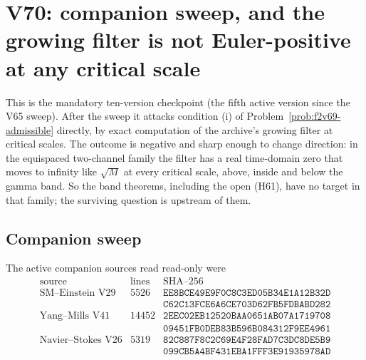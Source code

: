 \documentclass[11pt]{article}
\theoremstyle{definition}
\theoremstyle{remark}
\begin{document}




\clearpage
\section{V70: companion sweep, and the growing filter is not Euler-positive at any critical scale}
\label{sec:f2v70-filter}
\begingroup
\setcounter{equation}{0}
\renewcommand{\theequation}{N70.\arabic{equation}}
\renewcommand{\theHequation}{f2v70.\arabic{equation}}

This is the mandatory ten-version checkpoint (the fifth active version
since the V65 sweep).  After the sweep it attacks condition (i) of
Problem~\ref{prob:f2v69-admissible} directly, by exact computation of the
archive's growing filter at critical scales.  The outcome is negative and
sharp enough to change direction: in the equispaced two-channel family
the filter has a real time-domain zero that moves to infinity like
\(\sqrt M\) at every critical scale, above, inside and below the gamma
band.  So the band theorems, including the open (H61), have no target in
that family; the surviving question is upstream of them.

\subsection{Companion sweep}

The active companion sources read read-only were
\begin{equation}
\begin{array}{c|r|l}
\text{source}&\text{lines}&\text{SHA--256}\\ \hline
\text{SM--Einstein V29}&5526&
\texttt{EE8BCE49E9F0C8C3ED05B34E1A12B32D}\\
&&\texttt{C62C13FCE6A6CE703D62FB5FDBABD282}\\
\text{Yang--Mills V41}&14452&
\texttt{2EEC02EB12520BAA0651AB07A1719708}\\
&&\texttt{09451FB0DEB83B596B084312F9EE4961}\\
\text{Navier--Stokes V26}&5319&
\texttt{82C887F8C2C69E4F28FAD7C3DC8DE5B9}\\
&&\texttt{099CB5A4BF431EBA1FFF3E91935978AD}
\end{array}
\label{eq:f2v70-sources}
\end{equation}
\end{document}
